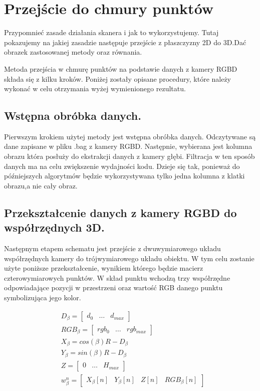 \section{Przejście do chmury punktów}
Przypomnieć zasade działania skanera i jak to wykorzystujemy. Tutaj pokazujemy na jakiej zasadzie następuje przejście z płaszczyzny 2D do 3D.Dać obrazek zastosowanej metody oraz równania.

Metoda przejścia w chmurę punktów na podstawie danych z kamery RGBD składa się z kilku kroków. Poniżej zostały opisane procedury, które należy wykonać w celu otrzymania wyżej wymienionego rezultatu.
\subsection{Wstępna obróbka danych.}
Pierwszym krokiem użytej metody jest wstępna obróbka danych. Odczytywane są dane zapisane w pliku .bag z kamery RGBD. Następnie, wybierana jest kolumna obrazu która posłuży do ekstrakcji danych z kamery głębi. Filtracja w ten sposób danych ma na celu zwiększenie wydajności kodu. Dzieje się tak, ponieważ do późniejszych algorytmów będzie wykorzystywana tylko jedna kolumna z klatki obrazu,a nie cały obraz.

\subsection{Przekształcenie danych z kamery RGBD do współrzędnych 3D.}
Następnym etapem schematu jest przejście z dwuwymiarowego układu współrzędnych kamery do trójwymiarowego układu obiektu. W tym celu zostanie użyte poniższe przekształcenie, wynikiem którego będzie macierz czterowymiarowych punktów. W skład punktu wchodzą trzy współrzędne odpowiadające pozycji w przestrzeni oraz wartość RGB danego punktu symbolizująca jego kolor.

\begin{equation}
    \begin{aligned}
            & D_{\beta}=\begin{bmatrix}d_{0} & \dots & d_{max} \end{bmatrix}  \\
            & RGB_{\beta}=\begin{bmatrix}rgb_{0} & \dots & rgb_{max} \end{bmatrix}  \\
            & X_{\beta}=cos(\beta)R-D_{\beta}  \\
            & Y_{\beta}=sin(\beta)R-D_{\beta}  \\
          & Z=\begin{bmatrix} 0 & \dots & H_{max} \end{bmatrix}  \\
          & w_{\beta}^n=\begin{bmatrix} X_{\beta}[n] & Y_{\beta}[n] & Z[n] & RGB_{\beta}[n]\end{bmatrix}  \\
    \end{aligned}
\end{equation}


